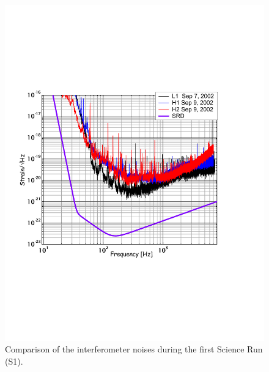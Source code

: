 \begin{figure}[!h]
\centerline{
\includegraphics[angle=0,width=6.5in]{Figures/Chap4/S1noiseComp.pdf}}
\caption[S1 Noise Curves]{Comparison of the interferometer noises during the
           first Science Run (S1).}
\label{fig:S1noiseComp}
\end{figure}


